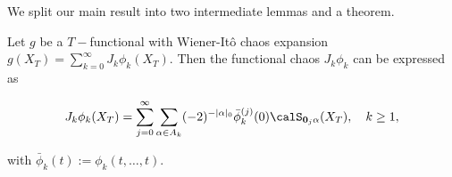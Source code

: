  We split our main result into two intermediate lemmas and a theorem. 
 \begin{lemma}\label{lem:chaos1}
 Let $g$ be a $T-$functional with Wiener-It\^ o chaos expansion  $g(X_T) = \sum_{k=0}^{\infty} J_k \phi_k (X_T)$.  %
 Then the functional chaos $J_k \phi_k$  can be expressed as  

 \begin{equation}\label{eq:chaos1}
     J_k \phi_k (X_T) = \sum_{j=0}^{\infty} \sum_{\alpha \in A_k} (-2)^{-|\alpha|_{0}} \bar{\phi}^{(j)}_k(0)  \calS_{\boldsymbol{0}_j\alpha} (X_T), \quad k \ge 1, 
 \end{equation}
 

 with $\bar{\phi}_k(t) := \phi_k(t,\ldots,t)$. 
 \end{lemma}
 
